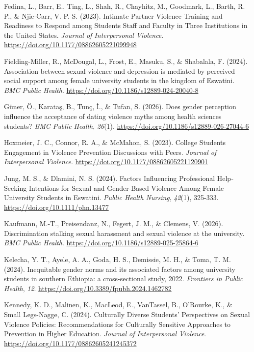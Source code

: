 \documentclass[
  spanish,
  11pt,
  letterpaper,
  DIV=11,
  numbers=noendperiod]{scrreprt}
\newlength{\cslhangindent}
\newenvironment{CSLReferences}[2] %
 {\begin{list}{}{%
  \setlength{\itemindent}{0pt}
  \setlength{\leftmargin}{0pt}
  \setlength{\parsep}{0pt}
  \ifodd #1
   \setlength{\leftmargin}{\cslhangindent}
   \setlength{\itemindent}{-1\cslhangindent}
  \fi
  \setlength{\itemsep}{#2\baselineskip}}}
 {\end{list}}
\begin{document}
\begin{CSLReferences}{1}{0}
Fedina, L., Barr, E., Ting, L., Shah, R., Chayhitz, M., Goodmark, L.,
Barth, R. P., \& Njie-Carr, V. P. S. (2023). Intimate Partner Violence
Training and Readiness to Respond among Students Staff and Faculty in
Three Institutions in the United States. \emph{Journal of Interpersonal
Violence}. \url{https://doi.org/10.1177/08862605221099948}

Fielding-Miller, R., McDougal, L., Frost, E., Masuku, S., \& Shabalala,
F. (2024). Association between sexual violence and depression is
mediated by perceived social support among female university students in
the kingdom of Eswatini. \emph{BMC Public Health}.
\url{https://doi.org/10.1186/s12889-024-20040-8}

Güner, Ö., Karataş, B., Tunç, İ., \& Tufan, S. (2026). Does gender
perception influence the acceptance of dating violence myths among
health sciences students? \emph{BMC Public Health}, \emph{26}(1).
\url{https://doi.org/10.1186/s12889-026-27044-6}

Hoxmeier, J. C., Connor, R. A., \& McMahon, S. (2023). College Students
Engagement in Violence Prevention Discussions with Peers. \emph{Journal
of Interpersonal Violence}.
\url{https://doi.org/10.1177/08862605221120901}

Jung, M. S., \& Dlamini, N. S. (2024). Factors Influencing Professional
Help‐Seeking Intentions for Sexual and Gender‐Based Violence Among
Female University Students in Eswatini. \emph{Public Health Nursing},
\emph{42}(1), 325-333. \url{https://doi.org/10.1111/phn.13477}

Kaufmann, M.-T., Preisendanz, N., Fegert, J. M., \& Clemens, V. (2026).
Discrimination stalking sexual harassment and sexual violence at the
university. \emph{BMC Public Health}.
\url{https://doi.org/10.1186/s12889-025-25864-6}

Kelecha, Y. T., Ayele, A. A., Goda, H. S., Demissie, M. H., \& Toma, T.
M. (2024). Inequitable gender norms and its associated factors among
university students in southern Ethiopia: a cross-sectional study, 2022.
\emph{Frontiers in Public Health}, \emph{12}.
\url{https://doi.org/10.3389/fpubh.2024.1462782}

Kennedy, K. D., Malinen, K., MacLeod, E., VanTassel, B., O'Rourke, K.,
\& Small Legs-Nagge, C. (2024). Culturally Diverse Students'
Perspectives on Sexual Violence Policies: Recommendations for Culturally
Sensitive Approaches to Prevention in Higher Education. \emph{Journal of
Interpersonal Violence}. \url{https://doi.org/10.1177/08862605241245372}


\end{CSLReferences}
\end{document}
